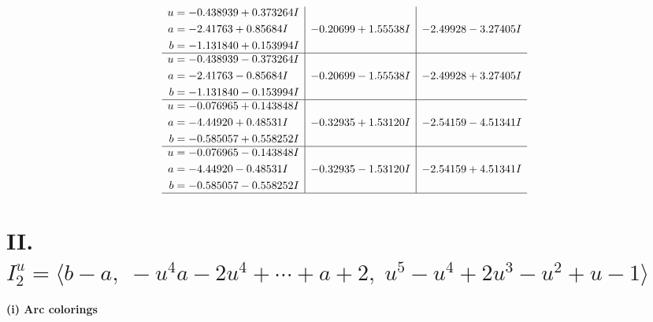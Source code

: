 \documentclass[1p]{elsarticle_modified}
\theoremstyle{definition}
\begin{document}
$$\begin{array}{c|c|c}
\begin{aligned}
u &= -0.438939 + 0.373264 I \\
a &= -2.41763 + 0.85684 I \\
b &= -1.131840 + 0.153994 I\end{aligned}
 & -0.20699 + 1.55538 I & -2.49928 - 3.27405 I \\ \hline\begin{aligned}
u &= -0.438939 - 0.373264 I \\
a &= -2.41763 - 0.85684 I \\
b &= -1.131840 - 0.153994 I\end{aligned}
 & -0.20699 - 1.55538 I & -2.49928 + 3.27405 I \\ \hline\begin{aligned}
u &= -0.076965 + 0.143848 I \\
a &= -4.44920 + 0.48531 I \\
b &= -0.585057 + 0.558252 I\end{aligned}
 & -0.32935 + 1.53120 I & -2.54159 - 4.51341 I \\ \hline\begin{aligned}
u &= -0.076965 - 0.143848 I \\
a &= -4.44920 - 0.48531 I \\
b &= -0.585057 - 0.558252 I\end{aligned}
 & -0.32935 - 1.53120 I & -2.54159 + 4.51341 I\\
 \hline 
 \end{array}$$\newpage\newpage\renewcommand{\arraystretch}{1}
\centering \section*{II. $I^u_{2}= \langle b- a,\;- u^4 a-2 u^4+\cdots+a+2,\;u^5- u^4+2 u^3- u^2+u-1 \rangle$}
\flushleft \textbf{(i) Arc colorings}\\
\end{document}

